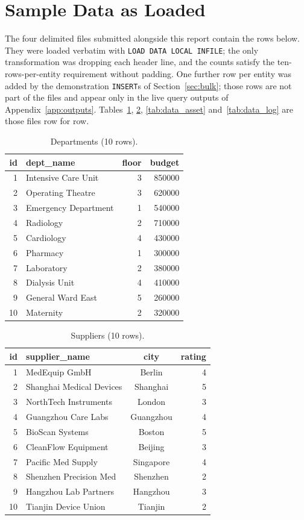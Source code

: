\documentclass[conference]{IEEEtran}
\begin{document}
\appendices

\section{Sample Data as Loaded}\label{app:data}
The four delimited files submitted alongside this report contain the
rows below. They were loaded verbatim with \texttt{LOAD DATA LOCAL
INFILE}; the only transformation was dropping each header line, and
the counts satisfy the ten-rows-per-entity requirement without padding.
One further row per entity was added by the demonstration \texttt{INSERT}s
of Section~\ref{sec:bulk}; those rows are not part of the files and
appear only in the live query outputs of Appendix~\ref{app:outputs}. Tables~\ref{tab:data_dept}, \ref{tab:data_supp},
\ref{tab:data_asset} and~\ref{tab:data_log} are those files row for row.

\begin{table}[!t]
\caption{Departments (10 rows).}
\label{tab:data_dept}
\centering
\footnotesize
\begin{tabular}{rp{2.6cm}rr}
\toprule
id & dept\_name & floor & budget \\
\midrule
1 & Intensive Care Unit & 3 & 850000 \\
2 & Operating Theatre & 3 & 620000 \\
3 & Emergency Department & 1 & 540000 \\
4 & Radiology & 2 & 710000 \\
5 & Cardiology & 4 & 430000 \\
6 & Pharmacy & 1 & 300000 \\
7 & Laboratory & 2 & 380000 \\
8 & Dialysis Unit & 4 & 410000 \\
9 & General Ward East & 5 & 260000 \\
10 & Maternity & 2 & 320000 \\
\bottomrule
\end{tabular}
\end{table}

\begin{table}[!t]
\caption{Suppliers (10 rows).}
\label{tab:data_supp}
\centering
\footnotesize
\begin{tabular}{rp{2.9cm}cr}
\toprule
id & supplier\_name & city & rating \\
\midrule
1 & MedEquip GmbH & Berlin & 4 \\
2 & Shanghai Medical Devices & Shanghai & 5 \\
3 & NorthTech Instruments & London & 3 \\
4 & Guangzhou Care Labs & Guangzhou & 4 \\
5 & BioScan Systems & Boston & 5 \\
6 & CleanFlow Equipment & Beijing & 3 \\
7 & Pacific Med Supply & Singapore & 4 \\
8 & Shenzhen Precision Med & Shenzhen & 2 \\
9 & Hangzhou Lab Partners & Hangzhou & 3 \\
10 & Tianjin Device Union & Tianjin & 2 \\
\bottomrule
\end{tabular}
\end{table}
\end{document}
